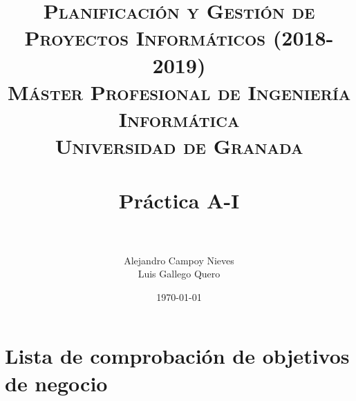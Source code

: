 

\title{	
	\normalfont \normalsize 
	\textsc{\textbf{Planificación y Gestión de Proyectos Informáticos (2018-2019)} \\ Máster Profesional de Ingeniería Informática \\ Universidad de Granada} \\ [25pt] %
	\horrule{0.5pt} \\[0.4cm] %
	\huge Práctica A-I \\ %
	\horrule{2pt} \\[0.5cm] %
}

\author{Alejandro Campoy Nieves \\ Luis Gallego Quero} %
\date{\normalsize\today} %

\usepackage[spanish, es-tabla]{babel}
\usepackage{hyperref} %
\hypersetup{
	colorlinks=true,
	linkcolor=blue,
	filecolor=magenta,      
	urlcolor=cyan,
}
\usepackage{graphicx}
\usepackage{amssymb, amsmath, amsbsy}
\usepackage{mathptmx}	
\usepackage{float}
\usepackage{booktabs}					%
\usepackage{eurosym}
\usepackage{xcolor}
\usepackage{colortbl}




	\maketitle %
	
	\newpage %
	
	\tableofcontents %
	
	\listoffigures
	
	\listoftables	
	
	\newpage	
 
\section{Lista de comprobación de objetivos de negocio}


